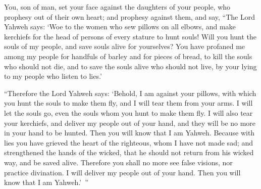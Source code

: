 {\par }{\PP {}You, son of man, set your face against the daughters of your people, who prophesy out of their own heart; and prophesy against them,
and say, “The Lord Yahweh says: ‘Woe to the women who sew pillows on all elbows, and make kerchiefs for the head of persons of every stature to hunt souls! Will you hunt the souls of my people, and save souls alive for yourselves?
You have profaned me among my people for handfuls of barley and for pieces of bread, to kill the souls who should not die, and to save the souls alive who should not live, by your lying to my people who listen to lies.’
\par }{\PP {}“Therefore the Lord Yahweh says: ‘Behold, I am against your pillows, with which you hunt the souls to make them fly, and I will tear them from your arms. I will let the souls go, even the souls whom you hunt to make them fly.
I will also tear your kerchiefs, and deliver my people out of your hand, and they will be no more in your hand to be hunted. Then you will know that I am Yahweh.
Because with lies you have grieved the heart of the righteous, whom I have not made sad; and strengthened the hands of the wicked, that he should not return from his wicked way, and be saved alive.
Therefore you shall no more see false visions, nor practice divination. I will deliver my people out of your hand. Then you will know that I am Yahweh.’ ”

}

